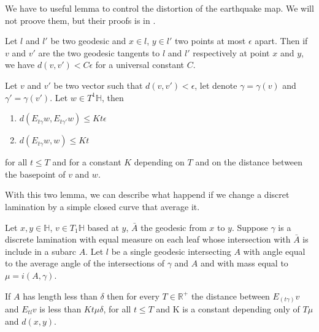 We have to useful lemma to control the distortion of the earthquake map. We will not proove them, but their proofs is in \cite{NielsenRealizationPro}.

\begin{lem}\label{DisVec}
Let $l$ and $l'$ be two geodesic and $x \in l$, $y \in l'$ two points at most $\epsilon$ apart. Then if $v$ and $v'$ are the two geodesic tangents to $l$ and $l'$ respectively at point $x$ and $y$,
we have $d(v,v')<C \epsilon$ for a universal constant $C$.
\end{lem}

\begin{lem}\label{DisShe}
Let $v$ and $v'$ be two vector such that $d(v,v') < \epsilon$, let denote $\gamma=\gamma(v)$ and $\gamma'=\gamma(v')$. Let $w\in T^1 \mathbb{H}$, then \begin{enumerate}
\item $d(E_{t \gamma}w,E_{t \gamma'}w) \leq Kt \epsilon$
\item $d(E_{t \gamma}w,w) \leq Kt $
\end{enumerate}
for all $t\leq T$ and for a constant $K$ depending on $T$ and on the distance between the basepoint of $v$ and $w$.
\end{lem}

With this two lemma, we can describe what happend if we change a discret lamination by a simple closed curve that average it.

\begin{lem}
Let $x,y \in \mathbb{H}$, $v\in T_1 \mathbb{H}$ based at $y$, $\bar{A}$ the geodesic from $x$ to $y$. Suppose $\gamma$ is a discrete lamination with equal measure on each leaf whose intersection with $\bar{A}$ is include in a subarc $A$. Let $l$ be a single geodesic intersecting $A$ with angle equal to the average angle of the intersections of $\gamma$ and $A$ and with mass equal to $\mu=i(A,\gamma)$.

If $A$ has length less than $\delta$ then for every $T\in \mathbb{R}^+$ the distance between $E_(t\gamma)v$ and $E_{t l}v$ is less than $Kt \mu \delta$, for all $t \leq T$ and K is a constant depending only of $T \mu$ and $d(x,y)$.
\end{lem}

